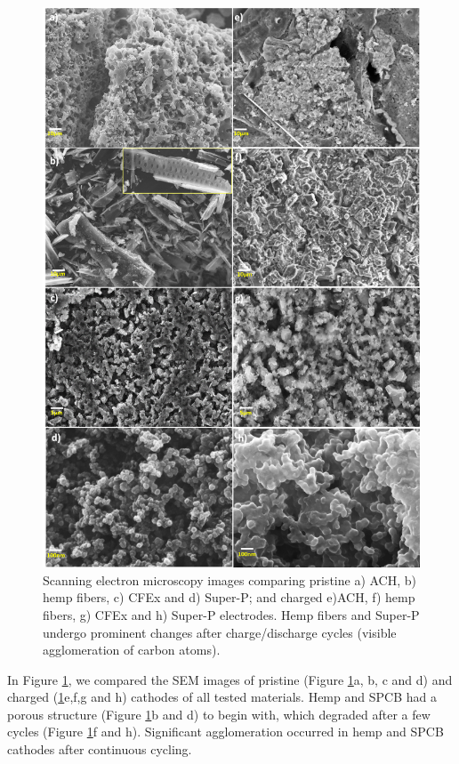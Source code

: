 \documentclass{article}
\begin{document}
\begin{figure}[tbh!]
  \centering
  \includegraphics[width=\textwidth]{figures/SEM}
    \caption{Scanning electron microscopy images comparing pristine a) ACH, b) hemp fibers, c) CFEx and d) Super-P; and charged e)ACH, f) hemp fibers, g) CFEx and h) Super-P electrodes. Hemp fibers and Super-P undergo prominent changes after charge/discharge cycles (visible agglomeration of carbon atoms).}
  \label{figures:SEM}
\end{figure}

In Figure \ref{figures:SEM}, we compared the SEM images of pristine (Figure \ref{figures:SEM}a, b, c and d) and charged (\ref{figures:SEM}e,f,g and h) cathodes of all tested materials. Hemp and SPCB had a porous structure (Figure \ref{figures:SEM}b and d) to begin with, which degraded after a few cycles (Figure \ref{figures:SEM}f and h). Significant agglomeration occurred in hemp and SPCB cathodes after continuous cycling.  
\end{document}
